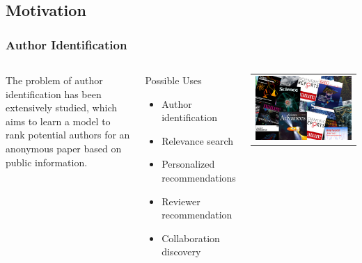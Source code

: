\subsection{Motivation}

\begin{frame}
\frametitle{Author Identification}

\begin{columns}

The problem of author identification has been extensively studied, which aims to learn a model to rank potential authors for an anonymous paper based on public information.

\pause
\begin{block}{Possible Uses}
    \begin{itemize}
        \item Author identification
        \item Relevance search
        \item Personalized recommendations
        \item Reviewer recommendation
        \item Collaboration discovery
    \end{itemize}
\end{block}

\begin{center}
\begin{tabular}{c}
\includegraphics[width=\textwidth]{img/journals}
\end{tabular}
\end{center}
\end{columns}
\end{frame}

